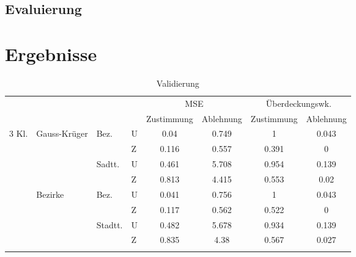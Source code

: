 \documentclass{Vorlage}
\begin{document}
\subsection{Evaluierung}

\section{Ergebnisse}

\begin{table}[h]
\centering
\caption{Validierung}
\label{vali}
\begin{tabular}{llll|cc|cc}
\hline \hline
                        &                               &                          &   & \multicolumn{2}{c|}{MSE} & \multicolumn{2}{c}{Überdeckungswk.} \\
                        &                               &                          &   & Zustimmung  & Ablehnung  & Zustimmung        & Ablehnung       \\ \hline
\multirow{12}{*}{3 Kl.} & \multirow{4}{*}{Gauss-Krüger} & \multirow{2}{*}{Bez.}    & U & 0.04       & 0.749      & 1                 & 0.043           \\
                        &                               &                          & Z & 0.116       & 0.557      & 0.391             & 0               \\ \cline{3-8} 
                        &                               & \multirow{2}{*}{Sadtt.}  & U & 0.461       & 5.708      & 0.954             & 0.139           \\
                        &                               &                          & Z & 0.813       & 4.415      & 0.553             & 0.02            \\ \cline{2-8} 
                        & \multirow{4}{*}{Bezirke}      & \multirow{2}{*}{Bez.}    & U & 0.041       & 0.756      & 1                 & 0.043           \\
                        &                               &                          & Z & 0.117       & 0.562      & 0.522             & 0               \\ \cline{3-8} 
                        &                               & \multirow{2}{*}{Stadtt.} & U & 0.482       & 5.678      & 0.934             & 0.139           \\
                        &                               &                          & Z & 0.835       & 4.38       & 0.567             & 0.027           \\ \cline{2-8} 

\end{tabular}
\end{table}
\end{document}
